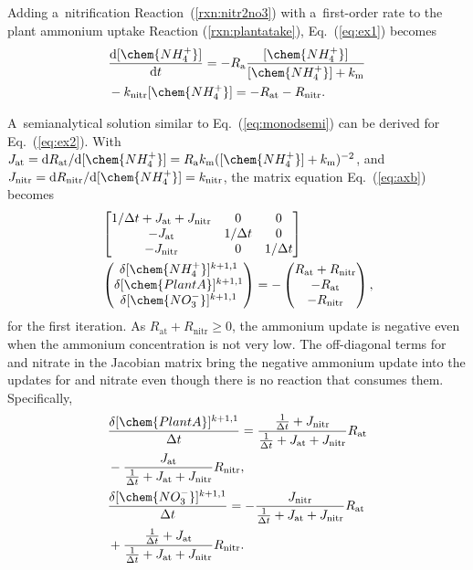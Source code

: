 \documentclass[gmd,noline]{copernicus}
\begin{document}
      Adding a~nitrification Reaction~(\ref{rxn:nitr2no3}) with
      a~first-order rate to the plant ammonium uptake Reaction
      (\ref{rxn:plantatake}), Eq.~(\ref{eq:ex1}) becomes
\begin{align}
 &
\frac{\mathrm{d} [\chem{NH_4^+}]}{\mathrm{d}t} = - R_\mathrm{a}
\frac{[\chem{NH_4^+}]}{[\chem{NH_4^+}]+k_\mathrm{m}} \nonumber\\&-
k_{\text{nitr}} [\chem{NH_4^+}] = -R_{\text{at}} - R_{\text{nitr}}.
\label{eq:ex2}
\end{align}%

      A~semianalytical solution similar to Eq.~(\ref{eq:monodsemi}) can be
      derived for Eq.~(\ref{eq:ex2}). With $J_{\text{at}} = \mathrm{d}
      R_{\text{at}}/\mathrm{d} [\chem{NH_4^+}] =
      R_\mathrm{a}k_\mathrm{m}([\chem{NH_4^+}] + k_\mathrm{m})^{-2}$, and
      $J_{\text{nitr}} = \mathrm{d} R_{\text{nitr}}/\mathrm{d}
      [\chem{NH_4^+}]=k_{\text{nitr}}$, the matrix equation
      Eq.~(\ref{eq:axb}) becomes
\begin{align}
 &
\left[
\begin{matrix}
1/\Delta t + J_{\text{at}} + J_{\text{nitr}} & 0 & 0 \\
-J_{\text{at}} & 1/\Delta t & 0 \\
-J_{\text{nitr}} & 0 & 1/\Delta t \\
\end{matrix}
\right]\nonumber\\& \left(\begin{matrix}
\delta [\chem{NH_4^+}]^{k+1,1} \\
\delta [\chem{PlantA}]^{k+1,1} \\
\delta [\chem{NO_3^-}]^{k+1,1}
\end{matrix}
\right)
=-
\left(\begin{matrix}
R_{\text{at}} + R_{\text{nitr}} \\
-R_{\text{at}} \\
-R_{\text{nitr}}
\end{matrix}
\right),
\label{eq:test2}
\end{align}%
      for the first iteration. As $R_{\text{at}} + R_{\text{nitr}} \geq 0$,
      the ammonium update is negative even when the ammonium concentration
      is not very low. The off-diagonal terms for  and nitrate
      in the Jacobian matrix bring the negative ammonium update into the
      updates for  and nitrate even though there is no reaction
      that consumes them. Specifically,
\begin{align}
 &
\frac{\delta [\chem{PlantA}]^{k+1,1}}{\Delta t} = \frac{\frac{1}{\Delta t} +
J_{\text{nitr}}}{\frac{1}{\Delta t} + J_{\text{at}} +
J_{\text{nitr}}} R_{\text{at}}\nonumber\\& - \frac{J_{\text{at}}}
{\frac{1}{\Delta t} + J_{\text{at}} + J_{\text{nitr}}} R_{\text{nitr}},
\\
& \frac{\delta [\chem{NO_3^-}]^{k+1,1}}{\Delta t} =
-\frac{J_{\text{nitr}}}{\frac{1}{\Delta t} + J_{\text{at}} + J_{\text{nitr}}}
R_{\text{at}} \nonumber\\& + \frac{\frac{1}{\Delta t} + J_{\text{at}}}
{\frac{1}{\Delta t} + J_{\text{at}} + J_{\text{nitr}}} R_{\text{nitr}}.
\end{align}%
\end{document}
